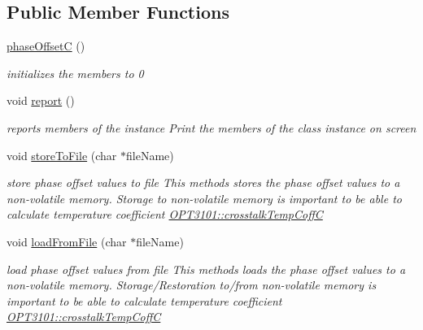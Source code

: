 \subsection*{Public Member Functions}
\begin{DoxyCompactItemize}
\item 
\mbox{\hyperlink{class_o_p_t3101_1_1phase_offset_c_af565b7d9f3261f8e9fc51c08a2f7339a}{phase\+OffsetC}} ()
\begin{DoxyCompactList}\small\item\em initializes the members to 0 \end{DoxyCompactList}\item 
void \mbox{\hyperlink{class_o_p_t3101_1_1phase_offset_c_a6baba22699fdb39d45adfd104a44534c}{report}} ()
\begin{DoxyCompactList}\small\item\em reports members of the instance Print the members of the class instance on screen \end{DoxyCompactList}\item 
void \mbox{\hyperlink{class_o_p_t3101_1_1phase_offset_c_ae542e328ed54d6e791c1350d878d1dd0}{store\+To\+File}} (char $\ast$file\+Name)
\begin{DoxyCompactList}\small\item\em store phase offset values to file This methods stores the phase offset values to a non-\/volatile memory. Storage to non-\/volatile memory is important to be able to calculate temperature coefficient \mbox{\hyperlink{class_o_p_t3101_1_1crosstalk_temp_coff_c}{O\+P\+T3101\+::crosstalk\+Temp\+CoffC}} \end{DoxyCompactList}\item 
void \mbox{\hyperlink{class_o_p_t3101_1_1phase_offset_c_ad6eeb78005b21ce0bd248829ae510045}{load\+From\+File}} (char $\ast$file\+Name)
\begin{DoxyCompactList}\small\item\em load phase offset values from file This methods loads the phase offset values to a non-\/volatile memory. Storage/\+Restoration to/from non-\/volatile memory is important to be able to calculate temperature coefficient \mbox{\hyperlink{class_o_p_t3101_1_1crosstalk_temp_coff_c}{O\+P\+T3101\+::crosstalk\+Temp\+CoffC}} \end{DoxyCompactList}\end{DoxyCompactItemize}
